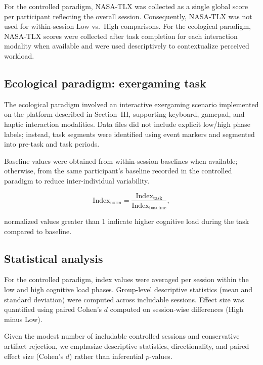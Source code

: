 \documentclass[10pt]{iopart}
\begin{document}
For the controlled paradigm, NASA-TLX was collected as a single global score per participant reflecting the overall session. Consequently, NASA-TLX was not used for within-session Low vs.\ High comparisons. For the ecological paradigm, NASA-TLX scores were collected after task completion for each interaction modality when available and were used descriptively to contextualize perceived workload.

\subsection{Ecological paradigm: exergaming task}
The ecological paradigm involved an interactive exergaming scenario implemented on the platform described in Section~III, supporting keyboard, gamepad, and haptic interaction modalities. Data files did not include explicit low/high phase labels; instead, task segments were identified using event markers and segmented into pre-task and task periods.

Baseline values were obtained from within-session baselines when available; otherwise, from the same participant’s baseline recorded in the controlled paradigm to reduce inter-individual variability.

\begin{equation}
\mathrm{Index}_{\mathrm{norm}} = \frac{\mathrm{Index}_{\mathrm{task}}}{\mathrm{Index}_{\mathrm{baseline}}},
\label{CLI}
\end{equation}

normalized values greater than 1 indicate higher cognitive load during the task compared to baseline.

\subsection{Statistical analysis}
For the controlled paradigm, index values were averaged per session within the low and high cognitive load phases. Group-level descriptive statistics (mean and standard deviation) were computed across includable sessions. Effect size was quantified using paired Cohen’s $d$ computed on session-wise differences (High minus Low).

Given the modest number of includable controlled sessions and conservative artifact rejection, we emphasize descriptive statistics, directionality, and paired effect size (Cohen's $d$) rather than inferential $p$-values.


\end{document}
